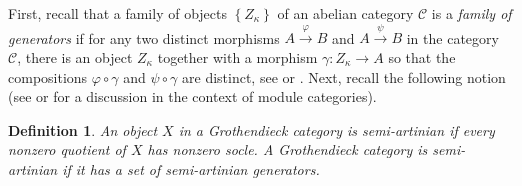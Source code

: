 \documentclass[11pt]{article}
\theoremstyle{plain}
\theoremstyle{nonumberplain}
\theoremstyle{plain}
\newtheorem{definition}[lemma]{Definition}
\theoremstyle{nonumberplain}
\begin{document}
First, recall that a family of objects $\left\{Z_\kappa\right\}$ of an
abelian category $\mathcal{C}$ is a \emph{family of generators} if for
any two distinct morphisms $A\overset{\varphi}{\longrightarrow}B$ and
$A\overset{\psi}{\longrightarrow}B$ in the category $\mathcal{C}$,
there is an object $Z_\kappa$ together with a morphism
$\gamma:Z_\kappa\to A$ so that the compositions $\varphi\circ\gamma$
and $\psi\circ\gamma$ are distinct, see \cite[$\S$V.7]{cats} or
\cite[discussion preceding Proposition 1.2.2]{groth}. Next, recall the
following notion (see \cite[$\S$5.6]{groth} or \cite[$\S$41]{BW} for a
discussion in the context of module categories).



\begin{definition}\label{def.sa}
  An object $X$ in a Grothendieck category is {\it semi-artinian} if every nonzero quotient of $X$ has nonzero socle.  A Grothendieck category is {\it semi-artinian} if it has a set of semi-artinian generators.
\end{definition}
\end{document}
